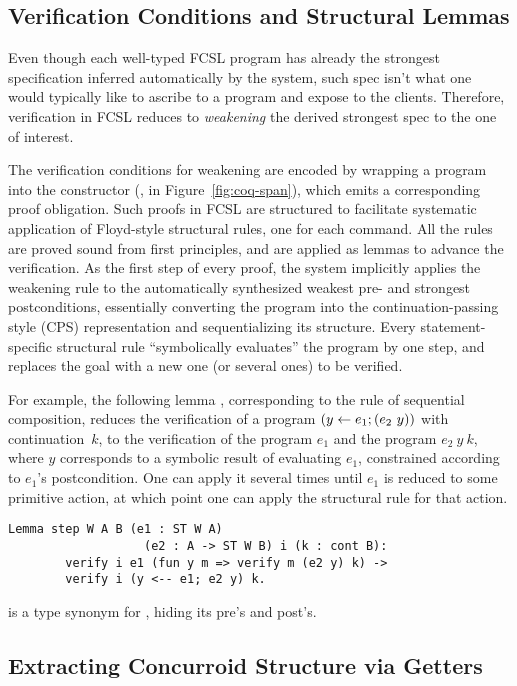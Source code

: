 \subsection{Verification Conditions and Structural Lemmas}
\label{sec:lemmas}

Even though each well-typed FCSL program has already the strongest
specification inferred automatically by the system, such spec isn't
what one would typically like to ascribe to a program and expose to
the clients. Therefore, verification in FCSL reduces to
\emph{weakening} the derived strongest spec to the one of interest.

The verification conditions for weakening are encoded by wrapping a
program into the  constructor (\eg, in
Figure~\ref{fig:coq-span}), which emits a corresponding proof
obligation.
%
Such proofs in FCSL are structured to facilitate systematic
application of Floyd-style structural rules, one for each command. All
the rules are proved sound from first principles, and are applied as
lemmas to advance the verification.
%
As the first step of every proof, the system implicitly applies the
weakening rule to the automatically synthesized weakest pre- and
strongest postconditions, essentially converting the program into the
continuation-passing style (CPS) representation and sequentializing
its structure.
%
Every statement-specific structural rule ``symbolically evaluates''
the program by one step, and replaces the goal with a new one (or
several ones) to be verified.

For example, the following lemma , corresponding to the
rule of sequential composition, reduces the verification of a program
$(y \leftarrow e_1; (e_2~y))$ with continuation~$k$, to the verification
of the program $e_1$ and the program $e_2~y~k$, where $y$ corresponds
to a symbolic result of evaluating $e_1$, constrained according to
$e_1$'s postcondition. One can apply it several times until $e_1$ is
reduced to some primitive action, at which point one can apply the
structural rule for that action.
%
\begin{lstlisting}
Lemma step W A B (e1 : ST W A) 
                   (e2 : A -> ST W B) i (k : cont B): 
        verify i e1 (fun y m => verify m (e2 y) k) ->
        verify i (y <-- e1; e2 y) k.  
\end{lstlisting}
%
 is a type synonym for , hiding its pre's and
post's.

\subsection{Extracting Concurroid Structure via Getters}
\label{sec:getters}

